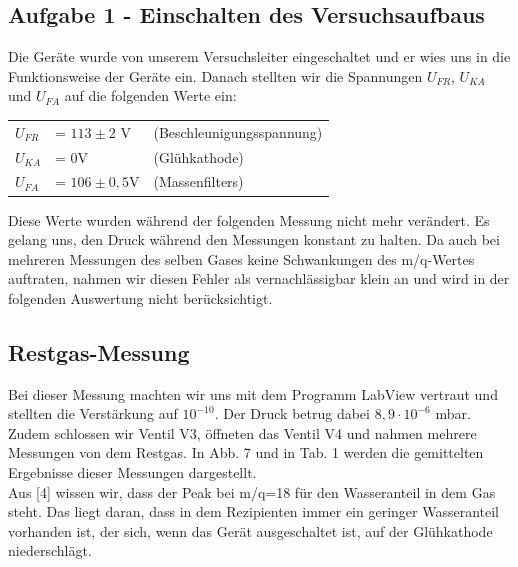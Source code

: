 \subsection{Aufgabe 1 - Einschalten des Versuchsaufbaus}
Die Geräte wurde von unserem Versuchsleiter eingeschaltet und er wies uns in die Funktionsweise der Geräte ein. Danach stellten wir die Spannungen $U_{FR}$, $U_{KA}$ und $U_{FA}$ auf die folgenden Werte ein:

\begin{tabular}{l l l}
$U_{FR}$ & = $113\pm 2$ V & (Beschleunigungsspannung)\\
$U_{KA}$ & = 0V & (Glühkathode)\\
$U_{FA}$ & = $106\pm 0,5$V & (Massenfilters)\\
\end{tabular}

Diese Werte wurden während der folgenden Messung nicht mehr verändert. 
Es gelang uns, den Druck während den Messungen konstant zu halten. Da auch bei mehreren Messungen des selben Gases keine Schwankungen des m/q-Wertes auftraten, nahmen wir diesen Fehler als vernachlässigbar klein an und wird in der folgenden Auswertung nicht berücksichtigt.

\subsection{Restgas-Messung}
Bei dieser Messung machten wir uns mit dem Programm LabView vertraut und stellten die Verstärkung auf $10^{-10}$. Der Druck betrug dabei $8,9 \cdot 10^{-6}$ mbar. Zudem schlossen wir Ventil V3, öffneten das Ventil V4 und nahmen mehrere Messungen von dem Restgas. In Abb. 7 und in Tab. 1 werden die gemittelten Ergebnisse dieser Messungen dargestellt.\\
Aus [4] wissen wir, dass der Peak bei m/q=18 für den Wasseranteil in dem Gas steht. Das liegt daran, dass in dem Rezipienten immer ein geringer Wasseranteil vorhanden ist, der sich, wenn das Gerät ausgeschaltet ist, auf der Glühkathode niederschlägt.



